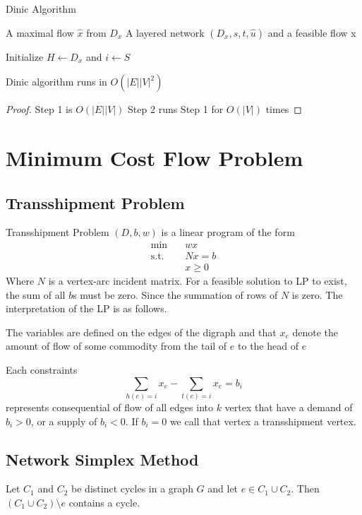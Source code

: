 				\begin{algorithm}
					\caption{Dinic Algorithm}
					\begin{algorithmic}
						\Ensure A maximal flow $\hat{x}$ from $D_x$
						\Require A layered network $(D_x, s, t, \hat{u})$ and a feasible flow x

						\State Initialize $H\gets D_x$ and $i\gets S$
					\end{algorithmic}
				\end{algorithm}

				\begin{theorem}
					Dinic algorithm runs in $O(|E||V|^2)$
				\end{theorem}

				\begin{proof}
					Step 1 is $O(|E||V|)$
					Step 2 runs Step 1 for $O(|V|)$ times
				\end{proof}

		\chapter{Minimum Cost Flow Problem}
			\section{Transshipment Problem}
				Transshipment Problem $(D, b, w)$ is a linear program of the form
				\begin{align}
					\min \quad & wx\\
					\text{s.t.} \quad & Nx = b\\
									  & x \ge 0
				\end{align}
				Where $N$ is a vertex-arc incident matrix. For a feasible solution to LP to exist, the sum of all $b$s must be zero. Since the summation of rows of $N$ is zero. The interpretation of the LP is as follows.

				The variables are defined on the edges of the digraph and that $x_e$ denote the amount of flow of some commodity from the tail of $e$ to the head of $e$

				Each constraints
				\begin{equation}
					\sum_{h(e) = i} x_e - \sum_{t(e) = i}x_e = b_i
				\end{equation}
				represents consequential of flow of all edges into $k$ vertex that have a demand of $b_i > 0$, or a supply of $b_i < 0$. If $b_i = 0$ we call that vertex a transshipment vertex.

			\section{Network Simplex Method}
				\begin{lemma}
					Let $C_1$ and $C_2$ be distinct cycles in a graph $G$ and let $e\in C_1 \cup C_2$. Then $(C_1 \cup C_2) \setminus e$ contains a cycle.
				\end{lemma}

